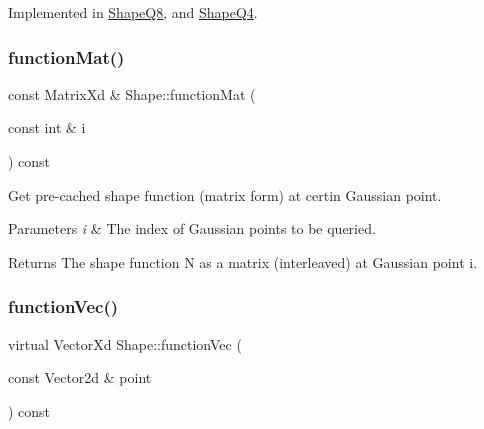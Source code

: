 Implemented in \mbox{\hyperlink{class_shape_q8_a5e84879bda809350eb6f70a6d01d73f1}{Shape\+Q8}}, and \mbox{\hyperlink{class_shape_q4_a9a74aff61bbcbfa73480cbe520a21563}{Shape\+Q4}}.

\mbox{\label{class_shape_a96b2b268631566142aa054211ddd9655}} 
\subsubsection{\texorpdfstring{function\+Mat()}{functionMat()}\hspace{0.1cm}{\footnotesize\ttfamily [2/2]}}
{\footnotesize\ttfamily const Matrix\+Xd \& Shape\+::function\+Mat (\begin{DoxyParamCaption}\item[{const int \&}]{i }\end{DoxyParamCaption}) const}



Get pre-\/cached shape function (matrix form) at certin Gaussian point. 


\begin{DoxyParams}{Parameters}
{\em i} & The index of Gaussian points to be queried. \\
\hline
\end{DoxyParams}
\begin{DoxyReturn}{Returns}
The shape function N as a matrix (interleaved) at Gaussian point i. 
\end{DoxyReturn}
\mbox{\label{class_shape_a0e0400bca54c29b5097c84ace51ecc7b}} 
\subsubsection{\texorpdfstring{function\+Vec()}{functionVec()}\hspace{0.1cm}{\footnotesize\ttfamily [1/2]}}
{\footnotesize\ttfamily virtual Vector\+Xd Shape\+::function\+Vec (\begin{DoxyParamCaption}\item[{const Vector2d \&}]{point }\end{DoxyParamCaption}) const\hspace{0.3cm}{\ttfamily [pure virtual]}}



